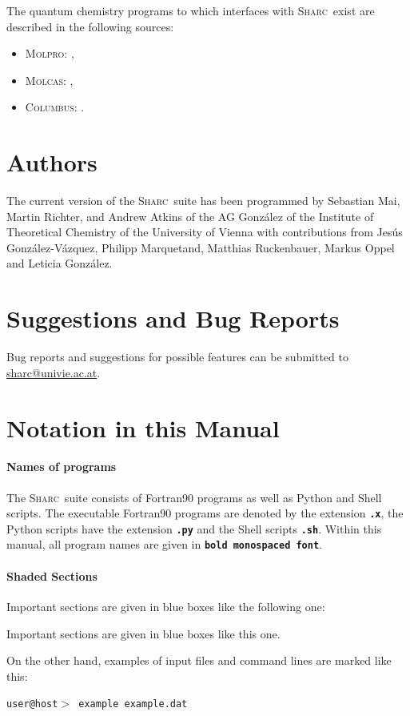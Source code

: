 \documentclass[a4paper,11pt,DIV=15,openany,twoside=false]{scrbook}
\newcommand{\tthdump}[1]{#1}
\newcommand{\sharc}{\textsc{Sharc}}
\newcommand{\ttt}[1]{\textbf{\texttt{#1}}}
\newenvironment{example}{
  \vspace{0mm}
  \definecolor{shadecolor}{HTML}{E4F4FF}
  \begin{shaded}
}{
  \end{shaded}
}
\begin{document}
The quantum chemistry programs to which interfaces with \sharc\ exist are described in the following sources:
\begin{itemize}
  \item \textsc{Molpro}: \cite{Werner2012WCMS, Werner2012},
  \item \textsc{Molcas}: \cite{Karlstrom2003CMS, Aquilante2010JCC, Aquilante2015JCC},
  \item \textsc{Columbus}: \cite{Lischka2011WCMS, Lischka2012, Yabushita1999JPCA, Mai2014JCP_reindex}.
\end{itemize}

\section{Authors}

The current version of the \sharc\ suite has been programmed by Sebastian Mai, Martin Richter, and Andrew Atkins of the AG Gonz\'alez of the Institute of Theoretical Chemistry of the University of Vienna with contributions from Jes\'us Gonz\'alez-V\'azquez, Philipp Marquetand, Matthias Ruckenbauer, Markus Oppel and Leticia Gonz\'alez.

\section{Suggestions and Bug Reports}

\begin{shaded}
Bug reports and suggestions for possible features can be submitted to \href{mailto:sharc@univie.ac.at}{sharc@univie.ac.at}.
\end{shaded}

\section{Notation in this Manual}

\paragraph{Names of programs}

The \sharc\ suite consists of Fortran90 programs as well as Python and Shell scripts. The executable Fortran90 programs are denoted by the extension \ttt{.x}, the Python scripts have the extension \ttt{.py} and the Shell scripts \ttt{.sh}. Within this manual, all program names are given in \ttt{bold monospaced font}.

\tthdump{
\paragraph{Shaded Sections}

Important sections are given in blue boxes like the following one:
\begin{shaded}
Important sections are given in blue boxes like this one.
\end{shaded}

On the other hand, examples of input files and command lines are marked like this:
\begin{example}
  \tt user@host$>$ example example.dat
\end{example}
}
\end{document}
